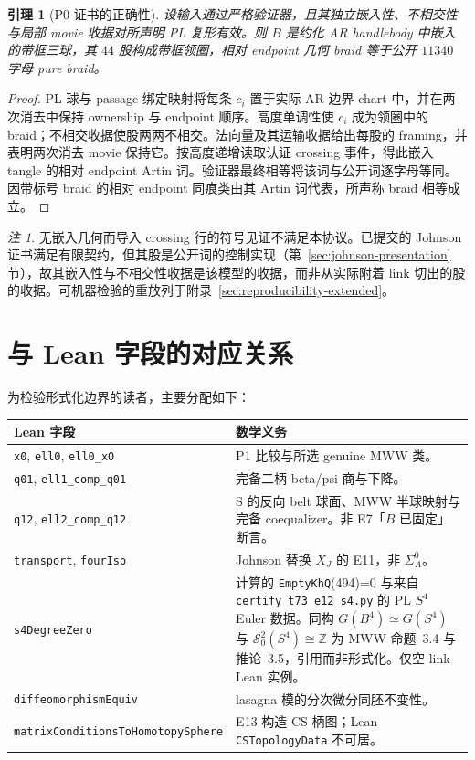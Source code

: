 \documentclass[11pt]{amsart}
\newtheorem{lemma}[theorem]{引理}
\theoremstyle{definition}
\theoremstyle{remark}
\newtheorem{remark}[theorem]{注}
\begin{document}
\begin{lemma}[P0 证书的正确性]
设输入通过严格验证器，且其独立嵌入性、不相交性与局部 movie 收据对所声明 PL 复形有效。则 $B$ 是约化 AR handlebody 中嵌入的带框三球，其 $44$ 股构成带框领圈，相对 endpoint 几何 braid 等于公开 $11340$ 字母 pure braid。
\end{lemma}

\begin{proof}
PL 球与 passage 绑定映射将每条 $c_i$ 置于实际 AR 边界 chart 中，并在两次消去中保持 ownership 与 endpoint 顺序。高度单调性使 $c_i$ 成为领圈中的 braid；不相交收据使股两两不相交。法向量及其运输收据给出每股的 framing，并表明两次消去 movie 保持它。按高度递增读取认证 crossing 事件，得此嵌入 tangle 的相对 endpoint Artin 词。验证器最终相等将该词与公开词逐字母等同。因带标号 braid 的相对 endpoint 同痕类由其 Artin 词代表，所声称 braid 相等成立。
\end{proof}

\begin{remark}
无嵌入几何而导入 crossing 行的符号见证不满足本协议。已提交的 Johnson 证书满足有限契约，但其股是公开词的控制实现（第~\ref{sec:johnson-presentation} 节），故其嵌入性与不相交性收据是该模型的收据，而非从实际附着 link 切出的股的收据。可机器检验的重放列于附录~\ref{sec:reproducibility-extended}。
\end{remark}

\section{与 Lean 字段的对应关系}\label{app:lean-fields}

为检验形式化边界的读者，主要分配如下：
\begin{center}
\small
\begin{tabularx}{\textwidth}{@{}l X@{}}
\toprule
Lean 字段 & 数学义务 \\
\midrule
\texttt{x0}, \texttt{ell0}, \texttt{ell0\_x0} & P1 比较与所选 genuine MWW 类。 \\
\texttt{q01}, \texttt{ell1\_comp\_q01} & 完备二柄 beta/psi 商与下降。 \\
\texttt{q12}, \texttt{ell2\_comp\_q12} & S 的反向 belt 球面、MWW 半球映射与完备 coequalizer。非 E7「$B$ 已固定」断言。 \\
\texttt{transport}, \texttt{fourIso} & Johnson 替换 $X_J$ 的 E11，非 $\Sigma_A^0$。 \\
\texttt{s4DegreeZero} & 计算的 \texttt{EmptyKhQ}(494)=0 与来自 \texttt{certify\_t73\_e12\_s4.py} 的 PL $S^4$ Euler 数据。同构 $G(B^4)\simeq G(S^4)$ 与 $\mathcal S^2_0(S^4)\cong\mathbb Z$ 为 MWW 命题~3.4 与推论~3.5，引用而非形式化。仅空 link Lean 实例。 \\
\texttt{diffeomorphismEquiv} & lasagna 模的分次微分同胚不变性。 \\
\texttt{matrixConditionsToHomotopySphere} & E13 构造 CS 柄图；Lean \texttt{CSTopologyData} 不可居。 \\
\bottomrule
\end{tabularx}
\end{center}
\end{document}
